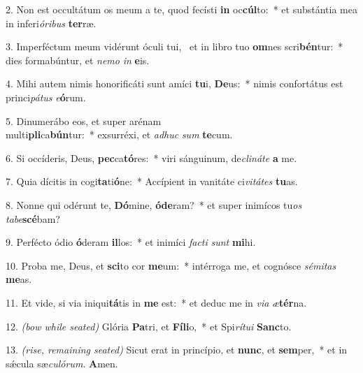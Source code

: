 	2. Non est occultátum os meum a te, quod fecísti \textbf{in} oc\textbf{cúl}to:~* et substántia mea in inferi\textit{ó}\textit{ri}\textit{bus} \textbf{ter}ræ.

	3. Imperféctum meum vidérunt óculi tui,~{\color{red}\GreDagger} et in libro tuo \textbf{om}nes scri\textbf{bén}tur:~* dies formabúntur, et \textit{ne}\textit{mo} \textit{in} \textbf{e}is.

	4. Mihi autem nimis honorificáti sunt amíci \textbf{tu}i, \textbf{De}us:~* nimis confortátus est princi\textit{pá}\textit{tus} \textit{e}\textbf{ó}rum.

	5. Dinumerábo eos, et super arénam\\ multi\textbf{pli}ca\textbf{bún}tur:~* exsurréxi, et \textit{ad}\textit{huc} \textit{sum} \textbf{te}cum.

	6. Si occíderis, Deus, \textbf{pec}ca\textbf{tó}res:~* viri sánguinum, de\textit{cli}\textit{ná}\textit{te} \textbf{a} me.

	7. Quia dícitis in cogi\textbf{ta}ti\textbf{ó}ne:~* Accípient in vanitáte ci\textit{vi}\textit{tá}\textit{tes} \textbf{tu}as.

	8. Nonne qui odérunt te, \textbf{Dó}mine, \textbf{ó}\textbf{de}ram?~* et super inimícos tu\textit{os} \textit{ta}\textit{be}\textbf{scé}bam?

	9. Perfécto ódio \textbf{ó}deram \textbf{il}los:~* et inimíci \textit{fac}\textit{ti} \textit{sunt} \textbf{mi}hi.

	10. Proba me, Deus, et \textbf{sci}to cor \textbf{me}um:~* intérroga me, et cognósce \textit{sé}\textit{mi}\textit{tas} \textbf{me}as.

	11. Et vide, si via iniqui\textbf{tá}tis in \textbf{me} est:~* et deduc me in \textit{vi}\textit{a} \textit{æ}\textbf{tér}na.

	12. {\color{red}\textit{(bow while seated)}} Glória \textbf{Pa}tri, et \textbf{Fí}\textbf{li}o,~* et Spi\textit{rí}\textit{tu}\textit{i} \textbf{Sanc}to.

	13. {\color{red}\textit{(rise, remaining seated)}} Sicut erat in princípio, et \textbf{nunc}, et \textbf{sem}per,~* et in s\'{\ae}cula sæ\textit{cu}\textit{ló}\textit{rum}. \textbf{A}men.
